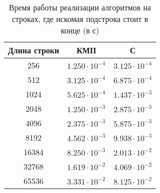 \begin{table}[h]
	\begin{center}
		\begin{threeparttable}
			\captionsetup{justification=raggedright,singlelinecheck=off}
			\caption{Время работы реализации алгоритмов на строках, где искомая подстрока стоит в конце (в с)}
			\label{tbl:time_measurements_1}
			\begin{tabular}{|c|c|c|}
				\hline
				Длина строки &  КМП  & С \\
				\hline
				256 &$ 1.250\cdot 10^{-4} $&$ 3.125\cdot 10^{-4}$\\
				\hline
				512 &$ 3.125\cdot 10^{-4} $&$ 6.875\cdot 10^{-4}$\\
				\hline
				1024 &$ 5.625\cdot 10^{-4} $&$ 1.437\cdot 10^{-3}$\\
				\hline
				2048 &$ 1.250\cdot 10^{-3} $&$ 2.875\cdot 10^{-3}$\\
				\hline
				4096 &$ 2.375\cdot 10^{-3} $&$ 5.875\cdot 10^{-3}$\\
				\hline
				8192 &$ 4.562\cdot 10^{-3} $&$ 9.938\cdot 10^{-3}$\\
				\hline
				16384 &$ 8.250\cdot 10^{-3} $&$ 2.013\cdot 10^{-2}$\\
				\hline
				32768 &$ 1.619\cdot 10^{-2} $&$ 4.069\cdot 10^{-2}$\\
				\hline
				65536 &$ 3.331\cdot 10^{-2} $&$ 8.125\cdot 10^{-2}$\\
				\hline
			\end{tabular}
		\end{threeparttable}
	\end{center}
\end{table}

